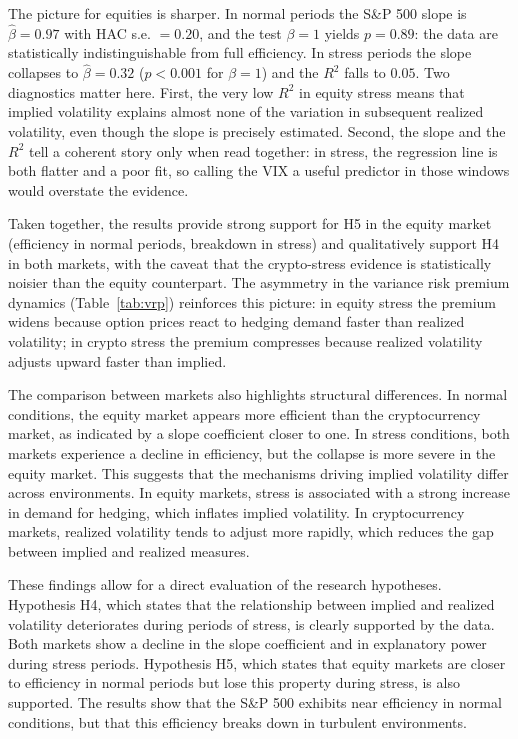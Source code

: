 \documentclass[11pt,a4paper,openany]{report}
\begin{document}
The picture for equities is sharper. In normal periods the S\&P 500
slope is $\hat{\beta}=0.97$ with HAC s.e. $=0.20$, and the test $\beta=1$
yields $p = 0.89$: the data are statistically indistinguishable from
full efficiency. In stress periods the slope collapses to
$\hat{\beta}=0.32$ ($p<0.001$ for $\beta=1$) and the $R^2$ falls to
$0.05$. Two diagnostics matter here. First, the very low $R^2$ in equity
stress means that implied volatility explains almost none of the
variation in subsequent realized volatility, even though the slope is
precisely estimated. Second, the slope and the $R^2$ tell a coherent
story only when read together: in stress, the regression line is both
flatter and a poor fit, so calling the VIX a useful predictor in those
windows would overstate the evidence.

Taken together, the results provide strong support for H5 in the equity
market (efficiency in normal periods, breakdown in stress) and
qualitatively support H4 in both markets, with the caveat that the
crypto-stress evidence is statistically noisier than the equity
counterpart. The asymmetry in the variance risk premium dynamics
(Table~\ref{tab:vrp}) reinforces this picture: in equity stress the
premium widens because option prices react to hedging demand faster than
realized volatility; in crypto stress the premium compresses because
realized volatility adjusts upward faster than implied.

The comparison between markets also highlights structural differences.
In normal conditions, the equity market appears more efficient than the
cryptocurrency market, as indicated by a slope coefficient closer to
one. In stress conditions, both markets experience a decline in
efficiency, but the collapse is more severe in the equity market. This
suggests that the mechanisms driving implied volatility differ across
environments. In equity markets, stress is associated with a strong
increase in demand for hedging, which inflates implied volatility. In
cryptocurrency markets, realized volatility tends to adjust more
rapidly, which reduces the gap between implied and realized measures.

These findings allow for a direct evaluation of the research hypotheses.
Hypothesis H4, which states that the relationship between implied and
realized volatility deteriorates during periods of stress, is clearly
supported by the data. Both markets show a decline in the slope
coefficient and in explanatory power during stress periods. Hypothesis
H5, which states that equity markets are closer to efficiency in normal
periods but lose this property during stress, is also supported. The
results show that the S\&P 500 exhibits near efficiency in normal
conditions, but that this efficiency breaks down in turbulent
environments.
\end{document}
